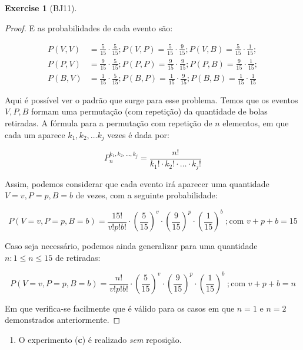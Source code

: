 \documentclass[
]{article}
\providecommand{\tightlist}{%
  \setlength{\itemsep}{0pt}\setlength{\parskip}{0pt}}
\theoremstyle{definition}
\theoremstyle{definition}
\theoremstyle{definition}
\newtheorem{exercise}{Exercise}[section]
\theoremstyle{definition}
\theoremstyle{remark}
\begin{document}
\begin{exercise}[BJ11]
\begin{proof}
E as probabilidades de cada evento são:

\begin{align*}
P(V,V) &= \frac{5}{15} \cdot \frac{5}{15}; P(V,P) = \frac{5}{15} \cdot \frac{9}{15}; P(V,B) = \frac{5}{15} \cdot \frac{1}{15};\\
P(P,V) &= \frac{9}{15} \cdot \frac{5}{15}; P(P,P) = \frac{9}{15} \cdot \frac{9}{15}; P(P,B) = \frac{9}{15} \cdot \frac{1}{15};\\
P(B,V) &= \frac{1}{15} \cdot \frac{5}{15}; P(B,P) = \frac{1}{15} \cdot \frac{9}{15}; P(B,B) = \frac{1}{15} \cdot \frac{1}{15}
\end{align*}

Aqui é possível ver o padrão que surge para esse problema. Temos que os eventos \(V,P,B\) formam uma permutação (com repetição) da quantidade de bolas retiradas. A fórmula para a permutação com repetição de \(n\) elementos, em que cada um aparece \(k_{1},k_{2}, \dots k_{j}\) vezes é dada por:

\begin{equation*}
P_{n}^{k_{1},k_{2},\dots,k_{j}} = \frac{n!}{k_{1}! \cdot k_{2}! \cdot \dots \cdot k_{j}!}
\end{equation*}

Assim, podemos considerar que cada evento irá aparecer uma quantidade \(V = v, P = p, B = b\) de vezes, com a seguinte probabilidade:

\begin{equation*}
P(V=v, P=p, B=b) = \frac{15!}{v!p!b!} \cdot \left(\frac{5}{15}\right)^{v} \cdot \left(\frac{9}{15}\right)^{p} \cdot \left(\frac{1}{15}\right)^{b} \; ; \text{com }v+p+b = 15
\end{equation*}

Caso seja necessário, podemos ainda generalizar para uma quantidade \(n : 1 \le n \le 15\) de retiradas:

\begin{equation*}
P(V=v, P=p, B=b) = \frac{n!}{v!p!b!} \cdot \left(\frac{5}{15}\right)^{v} \cdot \left(\frac{9}{15}\right)^{p} \cdot \left(\frac{1}{15}\right)^{b} \; ; \text{com }v+p+b = n
\end{equation*}

Em que verifica-se facilmente que é válido para os casos em que \(n=1\) e \(n=2\) demonstrados anteriormente.
\end{proof}

\begin{enumerate}
\def\labelenumi{\alph{enumi})}
\setcounter{enumi}{3}
\tightlist
\item
  O experimento (\textbf{c}) é realizado \emph{sem} reposição.
\end{enumerate}


\end{exercise}
\end{document}
